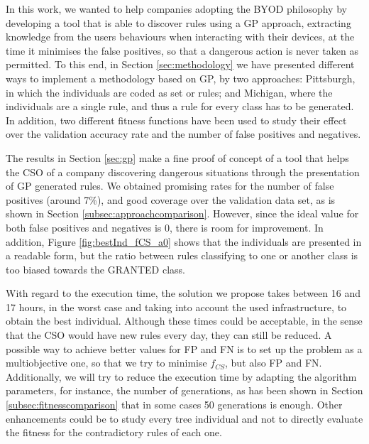 \documentclass[runningheads]{llncs}
\begin{document}

In this work, we wanted to help companies adopting the BYOD philosophy
by developing a tool that is able to discover rules using a GP
approach, extracting knowledge from the users behaviours when interacting with their
devices, at the time it minimises the false positives, so that a
dangerous action is never taken as permitted. To this end, in Section \ref{sec:methodology} we have
presented different ways to implement a methodology based on GP, by two
approaches: Pittsburgh, in which the individuals are coded as set or
rules; and Michigan, where the individuals are a single rule, and thus
a rule for every class has to be generated. In addition, two different
fitness functions have been used to study their effect over the
validation accuracy rate and the number of false positives and
negatives.

The results in Section \ref{sec:gp} make a fine proof of concept of a tool that helps the CSO of a company discovering dangerous situations through the presentation of GP generated rules. We obtained promising rates for the number of false positives (around
7\%), and good coverage over the validation data set, as is shown in
Section \ref{subsec:approachcomparison}. However, since the ideal
value for both false positives and negatives is 0, there is room for
improvement. In addition, Figure \ref{fig:bestInd_fCS_a0} shows
that the individuals are presented in a readable form, but the ratio
between rules classifying to one or another class is too biased
towards the GRANTED class. %

With regard to the execution time, the solution we propose takes between 16 and 17 hours, in the worst case and taking into account the used infrastructure, to obtain the best individual. Although these times could be acceptable, in the sense that the CSO would have new rules every day, they can still be reduced.  
A possible way to
achieve better values for FP and FN is to set up the problem as a
multiobjective one, so that we try to minimise $f_{CS}$, but also FP
and FN. Additionally, we will try to reduce the execution time by adapting the algorithm parameters, for instance, the number of generations, as has been shown in Section \ref{subsec:fitnesscomparison} that in some cases 50 generations is enough. Other enhancements could be to study every tree individual and not to directly evaluate the fitness for the contradictory rules of each one. 
\end{document}
